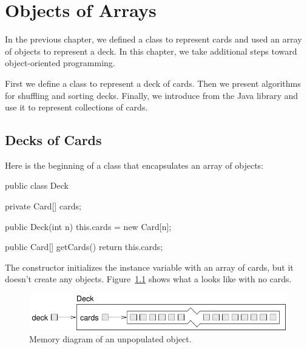 \chapter{Objects of Arrays}


In the previous chapter, we defined a class to represent cards and used an array of  objects to represent a deck.
In this chapter, we take additional steps toward object-oriented programming.

First we define a class to represent a deck of cards.
Then we present algorithms for shuffling and sorting decks.
Finally, we introduce  from the Java library and use it to represent collections of cards.




\section{Decks of Cards}
\label{deck}


Here is the beginning of a  class that encapsulates an array of  objects:

\begin{code}
public class Deck {
    private Card[] cards;

    public Deck(int n) {
        this.cards = new Card[n];
    }

    public Card[] getCards() {
        return this.cards;
    }
}
\end{code}


The constructor initializes the instance variable with an array of  cards, but it doesn't create any  objects.
Figure~\ref{fig.deckobject} shows what a  looks like with no cards.

\begin{figure}[!ht]
\begin{center}
\includegraphics{figs/deckobject.pdf}
\caption{Memory diagram of an unpopulated  object.}
\label{fig.deckobject}
\end{center}
\end{figure}

